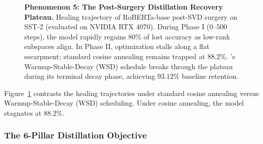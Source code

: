 \begin{figure}[t]
{
}
\caption[Phenomenon 5]{\textbf{Phenomenon 5: The Post-Surgery Distillation Recovery Plateau.} Healing trajectory of RoBERTa-base post-SVD surgery on SST-2 (evaluated on NVIDIA RTX 4070). During Phase I ($0\text{--}500$ steps), the model rapidly regains $80\%$ of lost accuracy as low-rank subspaces align. In Phase II, optimization stalls along a flat escarpment; standard cosine annealing remains trapped at $88.2\%$. \neuralops's Warmup-Stable-Decay (WSD) schedule breaks through the plateau during its terminal decay phase, achieving $93.12\%$ baseline retention.}
\label{fig:phenom5_wsd_recovery_plateau}
\end{figure}

Figure~\ref{fig:phenom5_wsd_recovery_plateau} contrasts the healing trajectories under standard cosine annealing versus Warmup-Stable-Decay (WSD) scheduling. Under cosine annealing, the model stagnates at $88.2\%$.

\subsubsection{The 6-Pillar Distillation Objective}
\label{sec:phenom_6pillar_objective}


